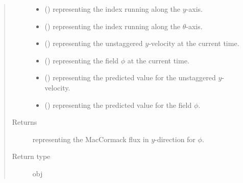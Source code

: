\documentclass[letterpaper,10pt,english]{sphinxmanual}
\begin{document}
\begin{fulllineitems}
\begin{fulllineitems}
\begin{quote}
\begin{description}
\begin{itemize}
\item {} 
 () \textendash{}  representing the index running along the \(y\)-axis.

\item {} 
 () \textendash{}  representing the index running along the \(\theta\)-axis.

\item {} 
 () \textendash{}  representing the unstaggered \(y\)-velocity at the current time.

\item {} 
 () \textendash{}  representing the field \(\phi\) at the current time.

\item {} 
 () \textendash{}  representing the predicted value for the unstaggered \(y\)-velocity.

\item {} 
 () \textendash{}  representing the predicted value for the field \(\phi\).

\end{itemize}

\item[{Returns}] \leavevmode
{} representing the MacCormack flux in \(y\)-direction for \(\phi\).

\item[{Return type}] \leavevmode
obj

\end{description}\end{quote}

\end{fulllineitems}



\end{fulllineitems}
\end{document}
